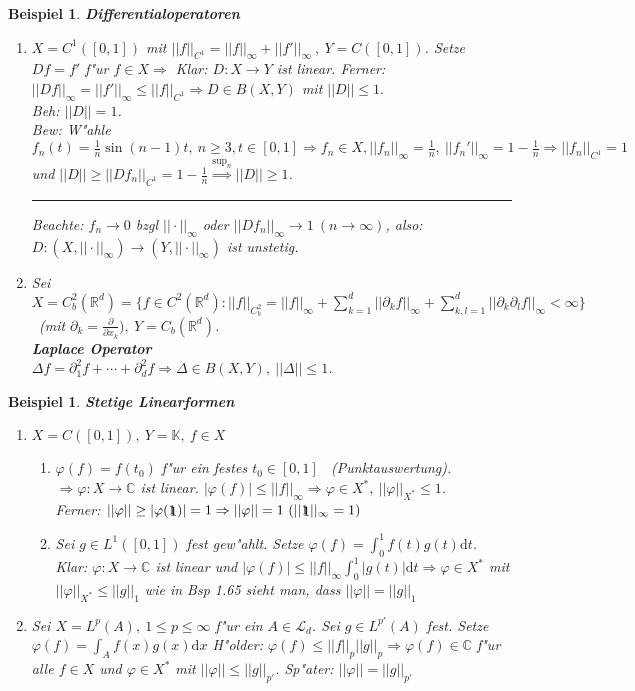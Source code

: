\documentclass[a4paper,11pt]{book}
\newcommand{\R}{{\mathbb R}}
\newcommand{\C}{{\mathbb C}}
\newcommand{\K}{{\mathbb K}}
\newcommand{\sL}{{\mathcal L}}
\newcommand{\sn}[1]{||#1||_{\infty}}
\newcommand{\eb}{\begin{flushright} \rule{1ex}{1ex} \end{flushright}}
\newcommand{\id}{1\hspace{-0,9ex}\raisebox{-0,2ex}{1}}
\def\d{\mbox{d}}
\newtheorem{Bsp}[Def]{Beispiel}
\theoremstyle{nonumberplain}
\begin{document}
\begin{Bsp}
\textbf{Differentialoperatoren}
\begin{enumerate}
\item[a)] $X = C^1([0,1])$ mit $||f||_{C^1} = \sn{f} + \sn{f'} \ ,\ Y = C([0,1])$. Setze $Df = f'$ f"ur $f \in X \Rightarrow$ Klar: $D: X \rightarrow Y$ ist linear. Ferner: $\sn{Df} = \sn{f'} \leq ||f||_{C^1} \Rightarrow D \in B(X,Y)$ mit $||D|| \leq 1.$\\
\emph{Beh:} $||D|| = 1$.\\
\emph{Bew:} W"ahle $f_n(t) = \frac1{n} \sin(n-1)t,\ n \geq 3, t \in [0,1] \Rightarrow f_n \in X, \sn{f_n} = \frac1{n}, \ \sn{f_n'} = 1 - \frac1{n} \Rightarrow ||f_n||_{C^1} = 1$ und $||D|| \geq ||Df_n||_{C^1} = 1 - \frac1{n} \stackrel{\sup_n}{\Rightarrow} ||D|| \geq 1$.\eb
Beachte: $f_n \rightarrow 0$ bzgl $\sn{\cdot}$ oder $\sn{Df_n} \rightarrow 1 \ (n \rightarrow \infty)$, also: $D: (X, \sn{\cdot}) \rightarrow (Y, \sn{\cdot})$ ist unstetig.
\item[b)] Sei $X = C_b^2(\R^d) = \{ f \in C^2(\R^d): ||f||_{C_b^2} = \sn{f} + \sum_{k=1}^d \sn{\partial_k f} + \sum_{k,l=1}^d \sn{\partial_k \partial_l f} < \infty \}$ \ (mit $\partial_k =\frac{\partial}{\partial x_k}),\ Y = C_b(\R^d)$.\\
\textbf{Laplace Operator}\\
$\Delta f = \partial_1^2 f + \cdots + \partial_d^2 f \Rightarrow \Delta \in B(X,Y),\ ||\Delta|| \leq 1$.
\end{enumerate}
\end{Bsp}

\begin{Bsp}
\textbf{Stetige Linearformen}
\begin{enumerate}
\item[a)] $X = C([0,1]),\ Y = \K,\ f \in X$
\begin{enumerate}
\item[(i)] $\varphi(f) = f(t_0)$ f"ur ein festes $t_0 \in [0,1]$ \ (Punktauswertung).\ $\Rightarrow \varphi: X \rightarrow \C$ ist linear. $|\varphi(f)| \leq \sn{f} \Rightarrow \varphi \in X^{\ast},\ ||\varphi||_{X^{\ast}} \leq 1$.\\
Ferner: $||\varphi|| \geq |\varphi(\id)| = 1 \Rightarrow || \varphi || = 1 \ (\sn{\id} = 1)$
\item[(ii)] Sei $g \in L^1([0,1])$ fest gew"ahlt. Setze $\varphi(f) = \int_0^1 f(t)g(t) \d t$. Klar: $\varphi: X \rightarrow \C$ ist linear und $|\varphi(f)| \leq \sn{f} \int_0^1 |g(t)| \d t \Rightarrow \varphi \in X^{\ast}$ mit $||\varphi||_{X^{\ast}} \leq ||g||_1$ wie in Bsp 1.65 sieht man, dass $||\varphi|| = ||g||_1$
\end{enumerate}
\item[b)] Sei $X = L^p(A),\ 1 \leq p \leq \infty$ f"ur ein $A \in \sL_d$. Sei $g \in L^{p'}(A)$ fest. Setze $\varphi(f) = \int_A f(x)g(x)\d x$ H"older: $\varphi(f) \leq ||f||_p ||g||_p \Rightarrow \varphi(f) \in \C$ f"ur alle $f \in X$ und $\varphi \in X^{\ast}$ mit $||\varphi|| \leq ||g||_{p'}$. Sp"ater: $||\varphi|| = ||g||_{p'}$
\end{enumerate}
\end{Bsp}
\end{document}
